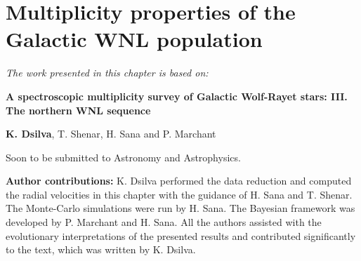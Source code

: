 \chapter{Multiplicity properties of the Galactic WNL population}\label{ch:wnl}

\textit{The work presented in this chapter is based on:}

\textbf{A spectroscopic multiplicity survey of Galactic Wolf-Rayet stars: III. The northern WNL sequence}

\textbf{K. Dsilva}, T. Shenar, H. Sana and P. Marchant

Soon to be submitted to {\sc Astronomy and Astrophysics}.

\textbf{Author contributions:} K. Dsilva performed the data reduction and computed the radial velocities in this chapter with the guidance of H. Sana and T. Shenar. The Monte-Carlo simulations were run by H. Sana. The Bayesian framework was developed by P. Marchant and H. Sana. All the authors assisted with the evolutionary interpretations of the presented results and contributed significantly to the text, which was written by K. Dsilva.
\newpage


